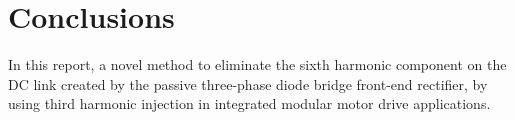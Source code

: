 \chapter{Conclusions}

In this report, a novel method to eliminate the sixth harmonic component on the DC link created by the passive three-phase diode bridge front-end rectifier, by using third harmonic injection in integrated modular motor drive applications.


